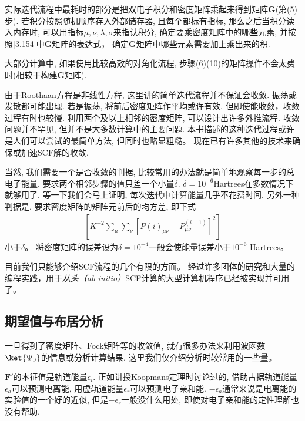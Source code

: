 实际迭代流程中最耗时的部分是把双电子积分和密度矩阵乘起来得到矩阵$\mathbf{G}$(第(5)步). 
若积分按照随机顺序存入外部储存器, 
且每个都标有指标, 
那么之后当积分读入内存时, 
可以用指标$\mu,\nu,\lambda,\sigma$来指认积分, 
确定要乘密度矩阵中的哪些元素, 
并按照\autoref{3.154}中$\mathbf{G}$矩阵的表达式， 
确定$\mathbf{G}$矩阵中哪些元素需要加上乘出来的积.


大部分计算中, 
如果使用比较高效的对角化流程, 
步骤(6)(10)的矩阵操作不会太费时(相较于构建$\mathbf{G}$矩阵).


由于Roothaan方程是非线性方程, 
这里讲的简单迭代流程并不保证会收敛. 
振荡或发散都可能出现. 
若是振荡, 
将前后密度矩阵作平均或许有效. 
但即使能收敛，收敛过程有时也较慢. 
利用两个及以上相邻的密度矩阵, 
可以设计出许多外推流程. 
收敛问题并不罕见, 
但并不是大多数计算中的主要问题. 
本书描述的这种迭代过程或许是人们可以尝试的最简单方法,
但同时也略显粗糙。 
现在已有许多其他的技术来确保或加速SCF解的收敛.


当然, 
我们需要一个是否收敛的判据, 
比较常用的办法就是简单地观察每一步的总电子能量, 
要求两个相邻步骤的值只差一个小量$\delta$. 
$\delta=10^{-6}$Hartrees在多数情况下就够用了. 
等一下我们会马上证明, 
每次迭代中计算能量几乎不花费时间. 
另外一种判据是, 
要求密度矩阵的矩阵元前后的均方差, 
即下式
\begin{align*}
	\left[ K^{-2}\sum_\mu\sum_\nu[P{(i)}_{\mu\nu}-P^{(i-1)}_{\mu\nu} ]^2 \right]
\end{align*} 
小于$\delta$。
将密度矩阵的误差设为$\delta=10^{-4}$一般会使能量误差小于$10^{-6}$ Hartrees。


目前我们只能够介绍SCF流程的几个有限的方面。 
经过许多团体的研究和大量的编程实践，用于\emph{从头（ab initio）}SCF计算的大型计算机程序已经被实现并可用了。 

\subsection{期望值与布居分析}
\label{sec:3.4.7}
一旦得到了密度矩阵、Fock矩阵等的收敛值, 
就有很多办法来利用波函数$\ket{\Psi_0}$的信息或分析计算结果. 
这里我们仅介绍分析时较常用的一些量。


$\mathbf{F'}$的本征值是轨道能量$\epsilon_i$. 
正如讲授Koopmans定理时讨论过的, 借助占据轨道能量$\epsilon_a$可以预测电离能, 用虚轨道能量$\epsilon_r$可以预测电子亲和能. $-\epsilon_a$通常来说是电离能的实验值的一个好的近似, 但是$-\epsilon_r$一般没什么用处, 即使对电子亲和能的定性理解也没有帮助.

